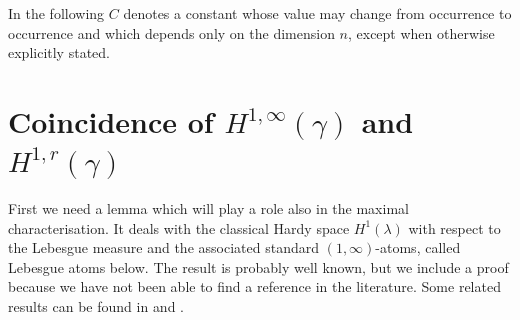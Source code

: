 \documentclass{amsart}                 %
\numberwithin{equation}{section}
\newcommand\1{{\bf 1}}
\begin{document}
In the following  $C$  denotes a constant whose value may change from occurrence 
to occurrence and which depends only on the dimension $n$, except when otherwise 
explicitly stated.


\section{Coincidence of $H^{1,\infty}(\gamma)$ and $H^{1,r}(\gamma)$} \label{s:prel}


First we need a lemma which will play a role also in the maximal 
characterisation. It  deals with the classical Hardy space  $H^1(\lambda)$ with respect 
to the Lebesgue measure and the associated standard $(1,\infty)$-atoms, called  Lebesgue atoms below.  
The result is probably well known, but we include a proof because we have not been able 
to find a reference in the literature. Some related results can be found in  \cite{CKS} and \cite{CMS}.
\end{document}
